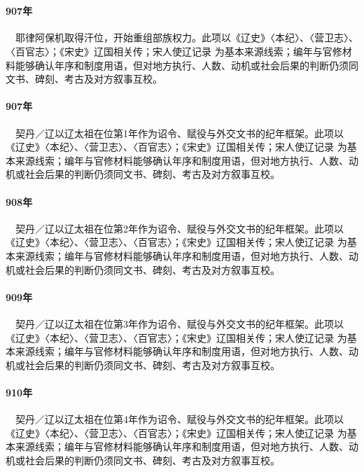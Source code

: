 \section{}

\paragraph{907年}　耶律阿保机取得汗位，开始重组部族权力。此项以《辽史》〈本纪〉、〈营卫志〉、〈百官志〉；《宋史》辽国相关传；宋人使辽记录 为基本来源线索；编年与官修材料能够确认年序和制度用语，但对地方执行、人数、动机或社会后果的判断仍须同文书、碑刻、考古及对方叙事互校。

\paragraph{907年}　契丹／辽以辽太祖在位第1年作为诏令、赋役与外交文书的纪年框架。此项以《辽史》〈本纪〉、〈营卫志〉、〈百官志〉；《宋史》辽国相关传；宋人使辽记录 为基本来源线索；编年与官修材料能够确认年序和制度用语，但对地方执行、人数、动机或社会后果的判断仍须同文书、碑刻、考古及对方叙事互校。

\paragraph{908年}　契丹／辽以辽太祖在位第2年作为诏令、赋役与外交文书的纪年框架。此项以《辽史》〈本纪〉、〈营卫志〉、〈百官志〉；《宋史》辽国相关传；宋人使辽记录 为基本来源线索；编年与官修材料能够确认年序和制度用语，但对地方执行、人数、动机或社会后果的判断仍须同文书、碑刻、考古及对方叙事互校。

\paragraph{909年}　契丹／辽以辽太祖在位第3年作为诏令、赋役与外交文书的纪年框架。此项以《辽史》〈本纪〉、〈营卫志〉、〈百官志〉；《宋史》辽国相关传；宋人使辽记录 为基本来源线索；编年与官修材料能够确认年序和制度用语，但对地方执行、人数、动机或社会后果的判断仍须同文书、碑刻、考古及对方叙事互校。

\paragraph{910年}　契丹／辽以辽太祖在位第4年作为诏令、赋役与外交文书的纪年框架。此项以《辽史》〈本纪〉、〈营卫志〉、〈百官志〉；《宋史》辽国相关传；宋人使辽记录 为基本来源线索；编年与官修材料能够确认年序和制度用语，但对地方执行、人数、动机或社会后果的判断仍须同文书、碑刻、考古及对方叙事互校。

